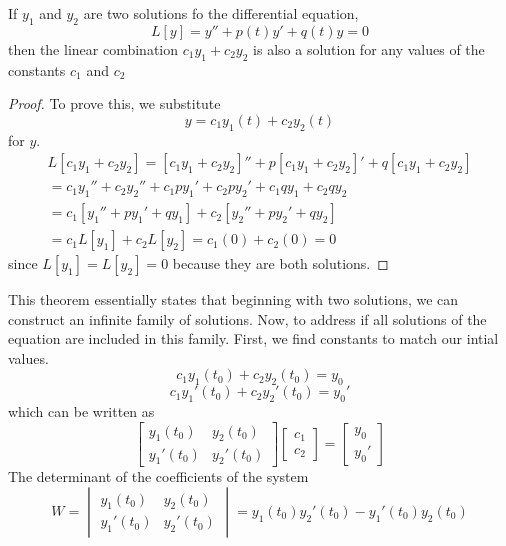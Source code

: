     \begin{theorem}
        If $y_1$ and $y_2$ are two solutions fo the differential equation,
        \begin{equation*}
            L[y] = y'' + p(t)y' + q(t)y = 0
        \end{equation*}
        then the linear combination $c_1y_1 + c_2y_2$ is also a solution for any values of the constants $c_1$ and $c_2$
    \end{theorem}
    \begin{proof}
        To prove this, we substitute $$y = c_1y_1(t) + c_2y_2(t)$$ for $y$.
        \begin{align*}
            L[c_1y_1 + c_2y_2] = [c_1y_1 + c_2y_2]'' + p[c_1y_1 + c_2y_2]' + q[c_1y_1 + c_2y_2] \\
            = c_1y_1'' + c_2y_2'' + c_1py_1' + c_2py_2' + c_1qy_1 + c_2qy_2 \\
            = c_1[y_1'' + py_1' + qy_1] + c_2[y_2'' + py_2' + qy_2] \\
            = c_1L[y_1] + c_2L[y_2] = c_1(0) + c_2(0) = 0
        \end{align*}
        since $L[y_1] = L[y_2] = 0$ because they are both solutions.
    \end{proof}
    This theorem essentially states that beginning with two solutions, we can construct an infinite family of solutions. Now, to address if all solutions of the equation are included in this family. First, we find constants to match our intial values.
    $$c_1y_1(t_0) + c_2y_2(t_0) = y_0$$
    $$c_1y_1'(t_0) + c_2y_2'(t_0) = y_0'$$
    which can be written as
    \begin{equation*}
        \begin{bmatrix}
            y_1(t_0) & y_2(t_0) \\
            y_1'(t_0) & y_2'(t_0)
        \end{bmatrix}
        \begin{bmatrix}
            c_1 \\
            c_2
        \end{bmatrix}
        =
        \begin{bmatrix}
            y_0 \\
            y_0'
        \end{bmatrix}
    \end{equation*}
    The determinant of the coefficients of the system
    \begin{equation*}
        W = \begin{vmatrix}
            y_1(t_0) & y_2(t_0) \\
            y_1'(t_0) & y_2'(t_0)
        \end{vmatrix} = y_1(t_0)y_2'(t_0) - y_1'(t_0)y_2(t_0)
    \end{equation*}
